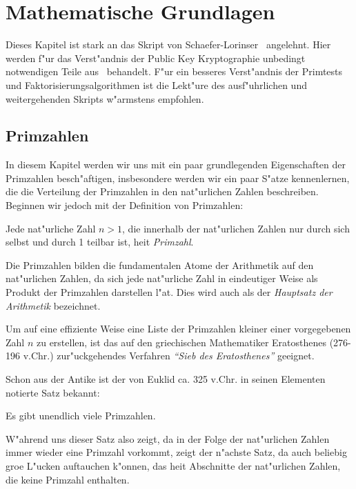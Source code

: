 \chapter{Mathematische Grundlagen}

Dieses Kapitel ist stark an das Skript von
Schaefer-Lorinser~\cite{frank} angelehnt. Hier werden f"ur das
Verst"andnis der Public Key Kryptographie unbedingt notwendigen
Teile aus~\cite{frank} behandelt. F"ur ein besseres Verst"andnis
der Primtests und Faktorisierungsalgorithmen ist die Lekt"ure des
ausf"uhrlichen und weitergehenden Skripts w"armstens empfohlen.

\section{Primzahlen}

In diesem Kapitel werden wir uns mit ein paar grundlegenden
Eigenschaften der Primzahlen besch"aftigen, insbesondere werden wir
ein paar S"atze kennenlernen, die die Verteilung der Primzahlen in den
nat"urlichen Zahlen beschreiben. Beginnen wir jedoch mit der
Definition von Primzahlen:

\begin{definition}[Primzahl]
Jede nat"urliche Zahl $n > 1$, die innerhalb der nat"urlichen Zahlen
nur durch sich selbst und durch 1 teilbar ist, hei\3t {\em Primzahl}.
\end{definition}

Die Primzahlen bilden die fundamentalen Atome der Arithmetik auf den
nat"urlichen Zahlen, da sich jede nat"urliche Zahl in eindeutiger
Weise als Produkt der Primzahlen darstellen l"a\3t. Dies wird auch als
der {\em Hauptsatz der Arithmetik} bezeichnet.

Um auf eine effiziente Weise eine Liste der Primzahlen kleiner einer
vorgegebenen Zahl $n$ zu erstellen, ist das auf den griechischen
Mathematiker Eratosthenes (276-196 v.Chr.) zur"uckgehendes Verfahren
{\em "`Sieb des Eratosthenes"'} geeignet.

Schon aus der Antike ist der von Euklid ca. 325 v.Chr. in seinen
Elementen notierte Satz bekannt:

\begin{satz}
Es gibt unendlich viele Primzahlen.
\end{satz}

W"ahrend uns dieser Satz also zeigt, da\3 in der Folge der
nat"urlichen Zahlen immer wieder eine Primzahl vorkommt, zeigt der
n"achste Satz, da\3 auch beliebig gro\3e L"ucken auftauchen k"onnen,
das hei\3t Abschnitte der nat"urlichen Zahlen, die keine Primzahl
enthalten.

